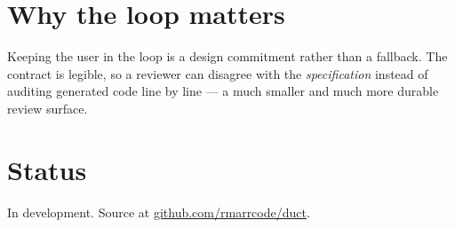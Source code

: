 \documentclass{article}
\begin{document}
\section{Why the loop matters}

Keeping the user in the loop is a design commitment rather than a fallback. The
contract is legible, so a reviewer can disagree with the \emph{specification}
instead of auditing generated code line by line --- a much smaller and much more
durable review surface.

\section{Status}

In development. Source at \href{https://github.com/rmarrcode/duct}{github.com/rmarrcode/duct}.
\end{document}
